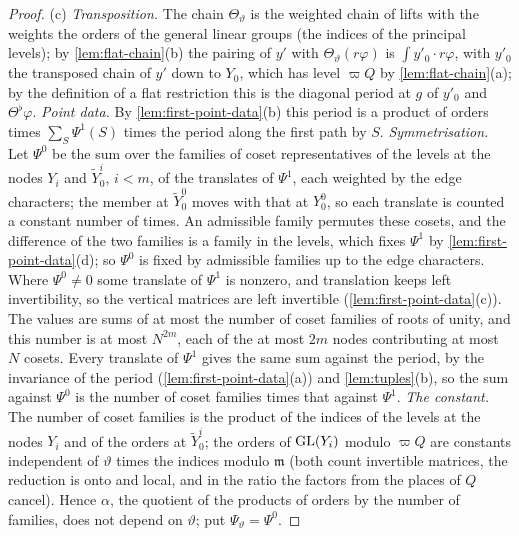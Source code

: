 \begin{proof}
(c) \emph{Transposition.} The chain $\Theta_\vartheta$ is the weighted chain of lifts with the weights the orders of the general linear groups (the indices of the principal levels); by \cref{lem:flat-chain}(b) the pairing of $y'$ with
$\Theta_\vartheta(r\varphi)$ is $\int y'_0\cdot r\varphi$, with $y'_0$ the transposed chain of $y'$ down to $Y_0$, which has level $\varpi Q$ by \cref{lem:flat-chain}(a); by the definition of a flat restriction this is the diagonal period
at $g$ of $y'_0$ and $\Theta^\flat\varphi$. \emph{Point data.} By \cref{lem:first-point-data}(b) this period is a product of orders times $\sum_S\Psi^1(S)$ times the period along the first path by $S$. \emph{Symmetrisation.} Let $\Psi^0$
be the sum over the families of coset representatives of the levels at the nodes $Y_i$ and $\tilde Y^i_0$, $i<m$, of the translates of $\Psi^1$, each weighted by the edge characters; the member at $\tilde Y^0_0$ moves with that at $Y^0_0$,
so each translate is counted a constant number of times. An admissible family permutes these cosets, and the difference of the two families is a family in the levels, which fixes $\Psi^1$ by \cref{lem:first-point-data}(d);
so $\Psi^0$ is fixed by admissible families up to the edge characters. Where $\Psi^0\ne0$ some translate of $\Psi^1$ is nonzero, and translation keeps left invertibility, so the vertical matrices are left invertible
(\cref{lem:first-point-data}(c)). The values are sums of at most the number of coset families of roots of unity, and this number is at most $N^{2m}$, each of the at most $2m$ nodes contributing at most $N$ cosets. Every
translate of $\Psi^1$ gives the same sum against the period, by the invariance of the period (\cref{lem:first-point-data}(a)) and \cref{lem:tuples}(b), so the sum against $\Psi^0$ is the number of coset families times that
against $\Psi^1$. \emph{The constant.} The number of coset families is the product of the indices of the levels at the nodes $Y_i$ and of the orders at $\tilde Y^i_0$; the orders of $\operatorname{GL}(Y_i)$ modulo $\varpi Q$ are constants
independent of $\vartheta$ times the indices modulo $\mathfrak m$ (both count invertible matrices, the reduction is onto and local, and in the ratio the factors from the places of $Q$ cancel). Hence $\alpha$, the quotient of the
products of orders by the number of families, does not depend on $\vartheta$; put $\Psi_\vartheta=\Psi^0$.
\end{proof}

